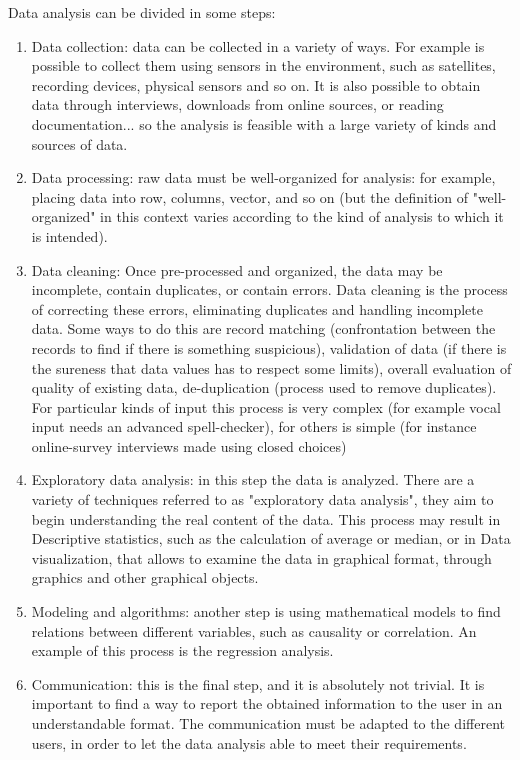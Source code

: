 Data analysis can be divided in some steps:

\begin{enumerate}

\item Data collection: data can be collected in a variety of ways. For example is possible to collect them using sensors in the environment, such as satellites, recording devices, physical sensors and so on. It is also possible to obtain data through interviews, downloads from online sources, or reading documentation... so the analysis is feasible with a large variety of kinds and sources of data. 

\item Data processing: raw data must be well-organized for analysis: for example, placing data into row, columns, vector, and so on (but the definition of "well-organized" in this context varies according to the kind of analysis to which it is intended).

\item Data cleaning: Once pre-processed and organized, the data may be incomplete, contain duplicates, or contain errors. Data cleaning is the process of correcting these errors, eliminating duplicates and handling incomplete data. Some ways to do this are record matching (confrontation between the records to find if there is something suspicious), validation of data (if there is the sureness that data values has to respect some limits), overall evaluation of quality of existing data, de-duplication (process used to remove duplicates). For particular kinds of input this process is very complex (for example vocal input needs an advanced spell-checker), for others is simple (for instance online-survey interviews made using closed choices) 

\item Exploratory data analysis: in this step the data is analyzed. There are a variety of techniques referred to as "exploratory data analysis", they aim to begin understanding the real content of the data. This process may result in Descriptive statistics, such as the calculation of average or median, or in Data visualization, that allows to examine the data in graphical format, through graphics and other graphical objects.

\item Modeling and algorithms: another step is using mathematical models to find relations between different variables, such as causality or correlation. An example of this process is the regression analysis.

\item Communication: this is the final step, and it is absolutely not trivial. It is important to find a way to report the obtained information to the user in an understandable format. The communication must be adapted to the different users, in order to let the data analysis able to meet their requirements.

\end{enumerate}
